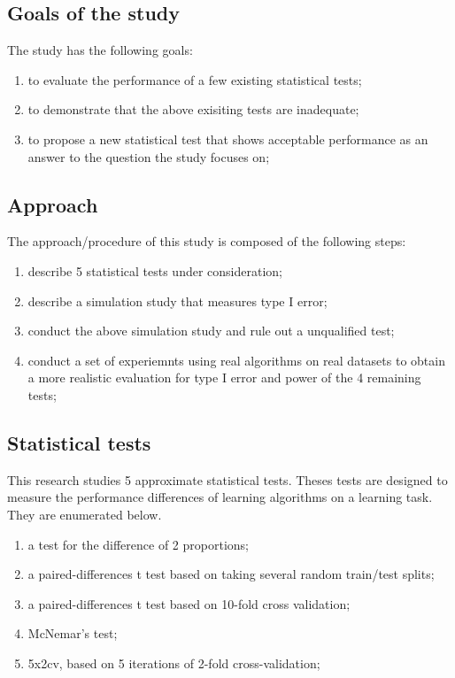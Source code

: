 \documentclass[12pt]{article}
\begin{document}
\subsection{Goals of the study}
The study has the following goals:
\begin{enumerate}
  \item to evaluate the performance of a few existing statistical tests;
  \item to demonstrate that the above exisiting tests are inadequate;
  \item to propose a new statistical test that shows acceptable performance as an answer to the question the study focuses on;
\end{enumerate}
\subsection{Approach}
The approach/procedure of this study is composed of the following steps:
\begin{enumerate}
  \item describe 5 statistical tests under consideration;
  \item describe a simulation study that measures type I error;
  \item conduct the above simulation study and rule out a unqualified test;
  \item conduct a set of experiemnts using real algorithms on real datasets to obtain a more realistic evaluation for type I error and power of the 4 remaining tests;
\end{enumerate}
\subsection{Statistical tests}
This research studies 5 approximate statistical tests. Theses tests are designed to measure the performance differences of learning algorithms on a learning task. They are enumerated below.
\begin{enumerate}
  \item a test for the difference of 2 proportions;
  \item a paired-differences t test based on taking several random train/test splits;
  \item a paired-differences t test based on 10-fold cross validation;
  \item McNemar's test;
  \item 5x2cv, based on 5 iterations of 2-fold cross-validation;
\end{enumerate}
\end{document}
